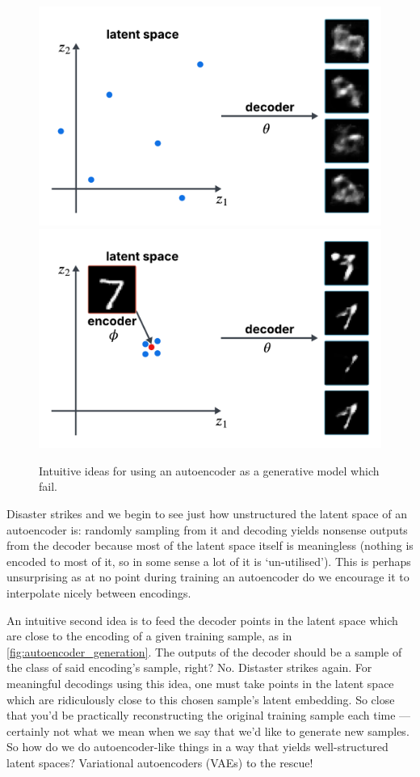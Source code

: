 \documentclass[11pt]{article}
\begin{document}
\begin{figure}[t]
    \centering
    \includegraphics[width=0.49\columnwidth]{./figures/generative_models/AE_gen_1.pdf}
    \includegraphics[width=0.49\columnwidth]{./figures/generative_models/AE_gen_2.pdf}
    \caption{Intuitive ideas for using an autoencoder as a generative model which fail.}
    \label{fig:autoencoder_generation}
\end{figure}

Disaster strikes and we begin to see just how unstructured the latent space of an autoencoder is: randomly sampling from it and decoding yields nonsense outputs from the decoder because most of the latent space itself is meaningless (nothing is encoded to most of it, so in some sense a lot of it is `un-utilised'). This is perhaps unsurprising as at no point during training an autoencoder do we encourage it to interpolate nicely between encodings.

An intuitive second idea is to feed the decoder points in the latent space which are close to the encoding of a given training sample, as in \autoref{fig:autoencoder_generation}. The outputs of the decoder should be a sample of the class of said encoding's sample, right? No. Distaster strikes again. For meaningful decodings using this idea, one must take points in the latent space which are ridiculously close to this chosen sample's latent embedding. So close that you'd be practically reconstructing the original training sample each time — certainly not what we mean when we say that we'd like to generate new samples. So how do we do autoencoder-like things in a way that yields well-structured latent spaces? Variational autoencoders (VAEs) to the rescue!
\end{document}

